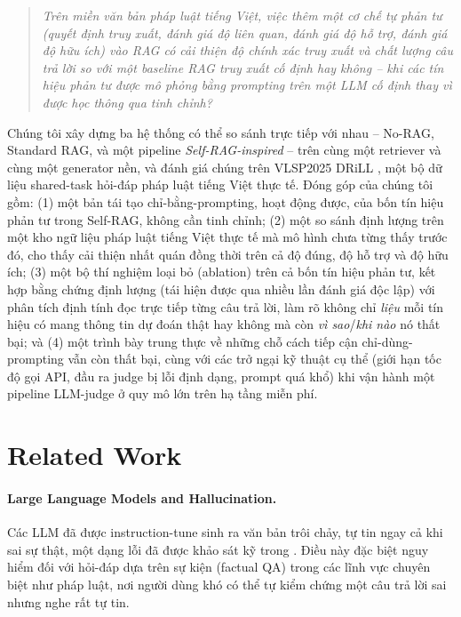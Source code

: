 \documentclass[11pt]{article}
\begin{document}
\begin{quote}
\emph{Trên miền văn bản pháp luật tiếng Việt, việc thêm một cơ chế tự phản tư (quyết định truy xuất, đánh giá độ liên quan, đánh giá độ hỗ trợ, đánh giá độ hữu ích) vào RAG có cải thiện độ chính xác truy xuất và chất lượng câu trả lời so với một baseline RAG truy xuất cố định hay không -- khi các tín hiệu phản tư được \emph{mô phỏng bằng prompting} trên một LLM cố định thay vì được học thông qua tinh chỉnh?}
\end{quote}

Chúng tôi xây dựng ba hệ thống có thể so sánh trực tiếp với nhau -- No-RAG, Standard RAG, và một pipeline \emph{Self-RAG-inspired} -- trên cùng một retriever và cùng một generator nền, và đánh giá chúng trên VLSP2025 DRiLL \citep{vlsp2025drill}, một bộ dữ liệu shared-task hỏi-đáp pháp luật tiếng Việt thực tế. Đóng góp của chúng tôi gồm: (1) một bản tái tạo chỉ-bằng-prompting, hoạt động được, của bốn tín hiệu phản tư trong Self-RAG, không cần tinh chỉnh; (2) một so sánh định lượng trên một kho ngữ liệu pháp luật tiếng Việt thực tế mà mô hình chưa từng thấy trước đó, cho thấy cải thiện nhất quán đồng thời trên cả độ đúng, độ hỗ trợ và độ hữu ích; (3) một bộ thí nghiệm loại bỏ (ablation) trên cả bốn tín hiệu phản tư, kết hợp bằng chứng định lượng (tái hiện được qua nhiều lần đánh giá độc lập) với phân tích định tính đọc trực tiếp từng câu trả lời, làm rõ không chỉ \emph{liệu} mỗi tín hiệu có mang thông tin dự đoán thật hay không mà còn \emph{vì sao}/\emph{khi nào} nó thất bại; và (4) một trình bày trung thực về những chỗ cách tiếp cận chỉ-dùng-prompting vẫn còn thất bại, cùng với các trở ngại kỹ thuật cụ thể (giới hạn tốc độ gọi API, đầu ra judge bị lỗi định dạng, prompt quá khổ) khi vận hành một pipeline LLM-judge ở quy mô lớn trên hạ tầng miễn phí.

\section{Related Work}
\label{sec:related}

\paragraph{Large Language Models and Hallucination.} Các LLM đã được instruction-tune \citep{brown2020language} sinh ra văn bản trôi chảy, tự tin ngay cả khi sai sự thật, một dạng lỗi đã được khảo sát kỹ trong \citet{ji2023survey}. Điều này đặc biệt nguy hiểm đối với hỏi-đáp dựa trên sự kiện (factual QA) trong các lĩnh vực chuyên biệt như pháp luật, nơi người dùng khó có thể tự kiểm chứng một câu trả lời sai nhưng nghe rất tự tin.
\end{document}
